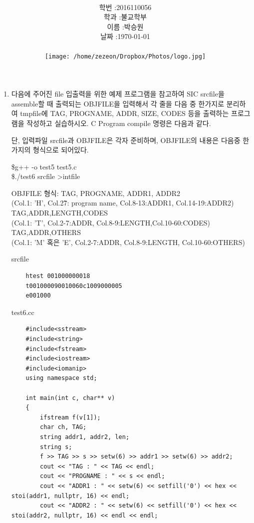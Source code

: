 \documentclass[12pt,a4paper]{article}
\title{
	\centering
	\pgfornament[width=12cm,color=teal]{84}\\
	\vspace{1cm}
	\fontsize{50}{50} \selectfont {시스템 S/W 실습6}\\
	\pgfornament[width=12cm,color=teal]{88}\\
	\vfill}
\author{
	\LARGE
	\begin{tabular}{rl}
		\hline
		학번 : & 2016110056\\ 
		학과 : & 불교학부 \\
		이름 : & 박승원\\
		날짜 : & \today\\
		\hline
	\end{tabular}\vspace{2cm}
	\\
	\texttt{[image: /home/zezeon/Dropbox/Photos/logo.jpg]}
}
\date{}
\begin{document}
\maketitle
\noindent
\lstset{columns=flexible, tabsize=4, frame=single, showstringspaces=false, breaklines=true, upquote=true}
\begin{enumerate}

\lstset{language=C}
\item 다음에 주어진 file 입출력을 위한 예제 프로그램을 참고하여 SIC srcfile을 assemble할 때 출력되는 OBJFILE을 입력해서 각 줄을 다음 중 한가지로 분리하여 tmpfile에 TAG, PROGNAME, ADDR, SIZE, CODES 등을 출력하는 프로그램을 작성하고 실습하시오. 
C Program compile 명령은 다음과 같다.

\vspace{1cm}
단, 입력파일 srcfile과 OBJFILE은 각자 준비하며, OBJFILE의 내용은 다음중 한가지의 형식으로 되어있다.

\$g++ -o test5 test5.c\\
\$./test6 srcfile \textgreater intfile


OBJFILE 형식:
TAG, PROGNAME, ADDR1, ADDR2\\
(Col.1: 'H', Col.2\~7: program name, Col.8-13:ADDR1, Col.14-19:ADDR2)\\
TAG,ADDR,LENGTH,CODES\\
(Col.1: 'T', Col.2-7:ADDR, Col.8-9:LENGTH,Col.10-60:CODES)\\
TAG,ADDR,OTHERS\\
(Col.1: 'M' 혹은 'E', Col.2-7:ADDR, Col.8-9:LENGTH, Col.10-60:OTHERS)

srcfile
\begin{lstlisting}
	htest 001000000018
	t001000090010060c1009000005
	e001000
\end{lstlisting}

test6.cc
\begin{lstlisting}
	#include<sstream>
	#include<string>
	#include<fstream>
	#include<iostream>
	#include<iomanip>
	using namespace std;
	
	int main(int c, char** v)
	{
		ifstream f(v[1]);
		char ch, TAG;
		string addr1, addr2, len;
		string s;
		f >> TAG >> s >> setw(6) >> addr1 >> setw(6) >> addr2;
		cout << "TAG : " << TAG << endl;
		cout << "PROGNAME : " << s << endl;
		cout << "ADDR1 : " << setw(6) << setfill('0') << hex << stoi(addr1, nullptr, 16) << endl;
		cout << "ADDR2 : " << setw(6) << setfill('0') << hex << stoi(addr2, nullptr, 16) << endl << endl;
	

\end{lstlisting}
\end{enumerate}
\end{document}
